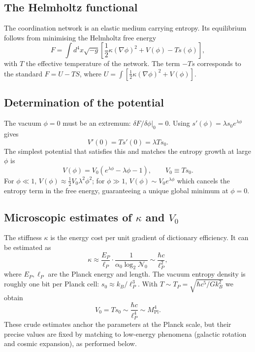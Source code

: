\documentclass[12pt,a4paper]{article}
\begin{document}
	\subsection{The Helmholtz functional}
	The coordination network is an elastic medium carrying entropy. Its equilibrium follows from minimising the Helmholtz free energy
	\begin{equation}
		F = \int d^4x \sqrt{-g} \left[ \frac{1}{2}\kappa (\nabla\phi)^2 + V(\phi) - T s(\phi) \right],
		\label{eq:F}
	\end{equation}
	with \(T\) the effective temperature of the network. The term \(-Ts\) corresponds to the standard \(F = U - TS\), where \(U = \int [\frac12\kappa(\nabla\phi)^2 + V(\phi)]\).
	
	\subsection{Determination of the potential}
	The vacuum \(\phi=0\) must be an extremum: \(\delta F/\delta\phi|_0 = 0\). Using \(s'(\phi) = \lambda s_0 e^{\lambda\phi}\) gives
	\[
	V'(0) = T s'(0) = \lambda T s_0.
	\]
	The simplest potential that satisfies this and matches the entropy growth at large \(\phi\) is
	\begin{equation}
		\boxed{V(\phi) = V_0 \left( e^{\lambda\phi} - \lambda\phi - 1 \right), \qquad V_0 \equiv T s_0.}
		\label{eq:V}
	\end{equation}
	For \(\phi \ll 1\), \(V(\phi) \approx \frac12 V_0 \lambda^2 \phi^2\); for \(\phi \gg 1\), \(V(\phi) \sim V_0 e^{\lambda\phi}\) which cancels the entropy term in the free energy, guaranteeing a unique global minimum at \(\phi=0\).
	
	\subsection{Microscopic estimates of \(\kappa\) and \(V_0\)}
	The stiffness \(\kappa\) is the energy cost per unit gradient of dictionary efficiency. It can be estimated as
	\[
	\kappa \approx \frac{E_P}{\ell_P} \cdot \frac{1}{\alpha_0 \log_2 \mathcal{N}_0} \sim \frac{\hbar c}{\ell_P^2},
	\]
	where \(E_P, \ell_P\) are the Planck energy and length. The vacuum entropy density is roughly one bit per Planck cell: \(s_0 \approx k_B / \ell_P^3\). With \(T \sim T_P = \sqrt{\hbar c^5 / G k_B^2}\) we obtain
	\[
	V_0 = T s_0 \sim \frac{\hbar c}{\ell_P^4} \sim M_{\mathrm{Pl}}^4.
	\]
	These crude estimates anchor the parameters at the Planck scale, but their precise values are fixed by matching to low-energy phenomena (galactic rotation and cosmic expansion), as performed below.
	
\end{document}
